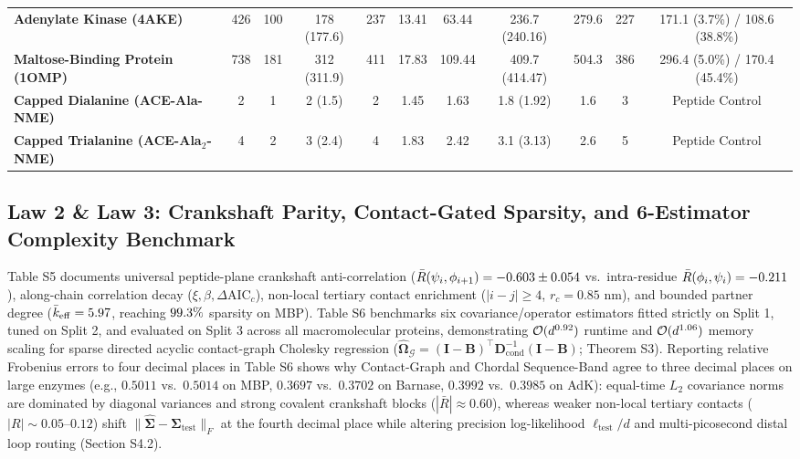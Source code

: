\documentclass[10pt,letterpaper]{article}
\begin{document}
\begin{table}[!htbp]
{\begin{tabular}{@{}l c c c c c c c c c c@{}}
\textbf{Adenylate Kinase (4AKE)} & 426 & 100 & 178 (177.6) & 237 & 13.41 & 63.44 & 236.7 (240.16) & 279.6 & 227 & 171.1 (3.7\%) / 108.6 (38.8\%) \\
\textbf{Maltose-Binding Protein (1OMP)} & 738 & 181 & 312 (311.9) & 411 & 17.83 & 109.44 & 409.7 (414.47) & 504.3 & 386 & 296.4 (5.0\%) / 170.4 (45.4\%) \\
\textbf{Capped Dialanine (ACE-Ala-NME)} & 2 & 1 & 2 (1.5) & 2 & 1.45 & 1.63 & 1.8 (1.92) & 1.6 & 3 & Peptide Control \\
\textbf{Capped Trialanine (ACE-Ala$_2$-NME)} & 4 & 2 & 3 (2.4) & 4 & 1.83 & 2.42 & 3.1 (3.13) & 2.6 & 5 & Peptide Control \\
\bottomrule[1.1pt]
\end{tabular}%
}
\end{table}

\subsection{Law 2 \& Law 3: Crankshaft Parity, Contact-Gated Sparsity, and 6-Estimator Complexity Benchmark}
Table S5 documents universal peptide-plane crankshaft anti-correlation ($\bar{R}(\psi_i,\phi_{i+1}) = -0.603{} \pm 0.054{}$ vs.\ intra-residue $\bar{R}(\phi_i,\psi_i) = -0.211{}$), along-chain correlation decay ($\xi, \beta, \Delta\mathrm{AIC}_c$), non-local tertiary contact enrichment ($|i-j|\ge 4$, $r_c = 0.85\text{ nm}$), and bounded partner degree ($\bar{k}_{\mathrm{eff}} = 5.97{}$, reaching $99.3{}\%$ sparsity on MBP). Table S6 benchmarks six covariance/operator estimators fitted strictly on Split 1, tuned on Split 2, and evaluated on Split 3 across all \vFourNumProteins{} macromolecular proteins, demonstrating $\mathcal{O}(d^{0.92{}})$ runtime and $\mathcal{O}(d^{1.06{}})$ memory scaling for sparse directed acyclic contact-graph Cholesky regression ($\hat{\bm{\Omega}}_{\mathcal{G}} = (\mathbf{I}-\mathbf{B})^\top\mathbf{D}_{\mathrm{cond}}^{-1}(\mathbf{I}-\mathbf{B})$; Theorem S3). Reporting relative Frobenius errors to four decimal places in Table S6 shows why Contact-Graph and Chordal Sequence-Band agree to three decimal places on large enzymes (e.g., $0.5011$ vs.\ $0.5014$ on MBP, $0.3697$ vs.\ $0.3702$ on Barnase, $0.3992$ vs.\ $0.3985$ on AdK): equal-time $L_2$ covariance norms are dominated by diagonal variances and strong covalent crankshaft blocks ($|\bar{R}|\approx 0.60$), whereas weaker non-local tertiary contacts ($|R|\sim 0.05\text{--}0.12$) shift $\|\hat{\bm{\Sigma}}-\bm{\Sigma}_{\mathrm{test}}\|_F$ at the fourth decimal place while altering precision log-likelihood $\ell_{\mathrm{test}}/d$ and multi-picosecond distal loop routing (Section S4.2).
\end{document}
